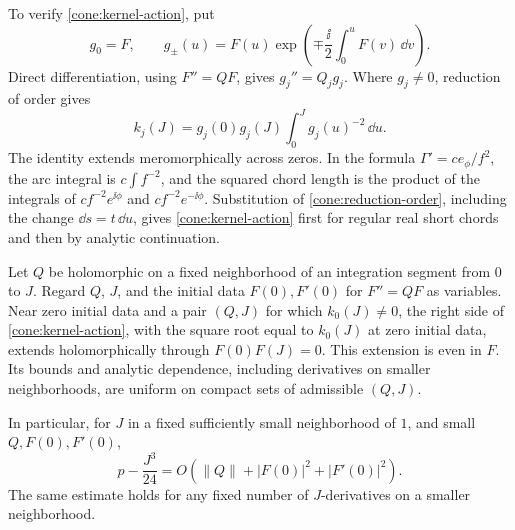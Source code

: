 To verify \eqref{cone:kernel-action}, put
\[
 g_0=F,\qquad
 g_\pm(u)=F(u)\exp\left(\mp\frac{\ii}{2}\int_0^u F(v)\,\dd v\right).
\]
Direct differentiation, using \(F''=QF\), gives
\(g_j''=Q_jg_j\). Where \(g_j\ne0\), reduction of order gives
\begin{equation}\label{cone:reduction-order}
 k_j(J)=g_j(0)g_j(J)\int_0^Jg_j(u)^{-2}\,\dd u.
\end{equation}
The identity extends meromorphically across zeros. In the formula
\(\Gamma'=ce_\phi/f^2\), the arc integral is \(c\int f^{-2}\), and the
squared chord length is the product of the integrals of
\(cf^{-2}e^{\ii\phi}\) and \(cf^{-2}e^{-\ii\phi}\).
Substitution of \eqref{cone:reduction-order}, including the change
\(\dd s=t\,\dd u\), gives \eqref{cone:kernel-action} first for regular real
short chords and then by analytic continuation.

\begin{lemma}\label{lem:kernel-division}
Let \(Q\) be holomorphic on a fixed neighborhood of an integration
segment from \(0\) to \(J\). Regard \(Q\), \(J\), and the initial data
\(F(0),F'(0)\) for \(F''=QF\) as variables. Near zero initial data and a
pair \((Q,J)\) for which \(k_0(J)\ne0\), the right side of
\eqref{cone:kernel-action}, with the square root equal to \(k_0(J)\) at
zero initial data, extends holomorphically through
\(F(0)F(J)=0\). This extension is even in \(F\). Its bounds and analytic
dependence, including derivatives on smaller neighborhoods, are uniform
on compact sets of admissible \((Q,J)\).

In particular, for \(J\) in a fixed sufficiently small neighborhood of
\(1\), and small \(Q,F(0),F'(0)\),
\begin{equation}\label{cone:small-action}
 p-\frac{J^3}{24}
 =O\left(\|Q\|+|F(0)|^2+|F'(0)|^2\right).
\end{equation}
The same estimate holds for any fixed number of \(J\)-derivatives on a
smaller neighborhood.
\end{lemma}

